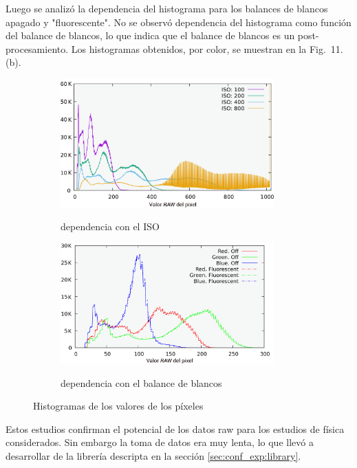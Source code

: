 \documentclass[twoside,twocolumn]{article}
\begin{document}
    Luego se analizó la dependencia del histograma para los balances de blancos apagado y "fluorescente".
    No se observó dependencia del histograma como función del balance de blancos,
    lo que indica que el balance de blancos es un post-procesamiento.
    Los histogramas obtenidos, por color, se muestran en la Fig.~11.(b).

    \begin{figure}[h]
      \centering
      \begin{subfigure}{.47\textwidth}
        \includegraphics[width=0.9\textwidth]{figures/ISO.png}
        \label{fig:ISO}
        \caption{dependencia con el ISO}
      \end{subfigure}
      \begin{subfigure}{.47\textwidth}
        \includegraphics[width=0.9\textwidth]{figures/WB_component_transparent.png}
        \label{fig:WB}
        \caption{dependencia con el balance de blancos}
      \end{subfigure}
      \caption{Histogramas de los valores de los píxeles}
      \label{fig:histo_picamera}
    \end{figure}

    Estos estudios confirman el potencial de los datos raw para los estudios de física considerados.
    Sin embargo la toma de datos era muy lenta, lo que llevó a desarrollar de la librería descripta
    en la sección \ref{sec:conf_exp:library}.
\end{document}
